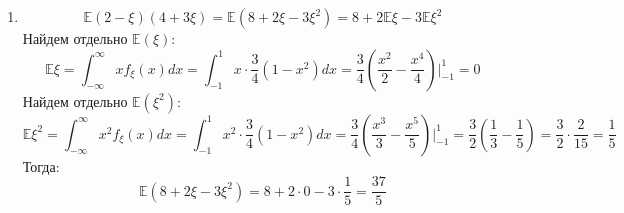 \begin{solution}
\begin{enumerate}[label=\alph*)]
\[\begin{tikzpicture}[>=latex]
\begin{axis}
                          \addplot [domain=-1:1,color=red, samples=100] {3/4*(1-x*x)};
                          \addplot [domain=-1.5:-1,color=red, samples=100] {0};
                          \addplot [domain=1:1.5,color=red, samples=100] {0};
                          \node at (axis cs:0.04,-0.045) {$0$};
                      \end{axis}
                  \end{tikzpicture}
              \]

              \[
                  \begin{tikzpicture}[>=latex]
                      \begin{axis}[
                              width=0.8\textwidth,
                              height=0.6\textwidth,
                              axis x line=center,
                              axis y line=center,
                              xtick={-1.4,-1.2,...,1.4},
                              ytick={0,0.1,...,1},
                              xlabel={$x$},
                              ylabel={$F_\xi(x)$},
                              xlabel style={below right},
                              ylabel style={above left},
                              xmin=-1.15,
                              xmax=1.15,
                              ymin=-0.2,
                              ymax=1.1,
                              legend style={nodes={scale=1}}]

                          \addplot [domain=-1:1,color=blue, samples=100] {3/4*(x - x*x*x/3) + 1/2};
                          \addplot [domain=-1.5:-1,color=blue, samples=100] {0};
                          \addplot [domain=1:1.5,color=blue, samples=100] {1};
                          \node at (axis cs:0.04,-0.045) {$0$};
                      \end{axis}
                  \end{tikzpicture}
              \]

        \item \[
                  \mathbb{E}(2 - \xi)(4 + 3\xi) = \mathbb{E}(8 + 2 \xi - 3\xi^2) = 8 + 2 \mathbb{E}\xi - 3 \mathbb{E}\xi^2
              \]
              Найдем отдельно \(\mathbb{E}(\xi)\):
              \[
                  \mathbb{E}\xi = \int_{-\infty}^{\infty} x f_\xi(x) dx = \int_{-1}^1 x \cdot \frac{3}{4} (1 - x^2) dx = \frac{3}{4} \left( \frac{x^2}{2} - \frac{x^4}{4} \right) \bigg|_{-1}^1 = 0
              \]
              Найдем отдельно \(\mathbb{E}(\xi^2)\):
              \[
                  \mathbb{E}\xi^2 = \int_{-\infty}^{\infty} x^2 f_\xi(x) dx = \int_{-1}^1 x^2 \cdot \frac{3}{4} (1 - x^2) dx = \frac{3}{4} \left( \frac{x^3}{3} - \frac{x^5}{5} \right) \bigg|_{-1}^1 = \frac{3}{2} \left( \frac{1}{3} - \frac{1}{5} \right) = \frac{3}{2} \cdot \frac{2}{15} = \frac{1}{5}
              \]
              Тогда:
              \[
                  \mathbb{E}(8 + 2 \xi - 3\xi^2) = 8 + 2 \cdot 0 - 3 \cdot \frac{1}{5} = \frac{37}{5}
              \]


\end{enumerate}
\end{solution}
